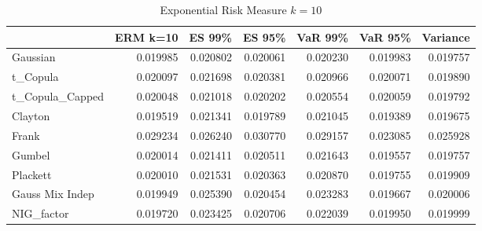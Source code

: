 
\begin{table}
\begin{tabular}{lrrrrrr}
\toprule
{} &  ERM k=10 &    ES 99\% &    ES 95\% &   VaR 99\% &   VaR 95\% &  Variance \\
\midrule
Gaussian        &  0.019985 &  0.020802 &  0.020061 &  0.020230 &  0.019983 &  \color{blue}0.019757 \\
t\_Copula        &  0.020097 &  0.021698 &  0.020381 &  0.020966 &  0.020071 &  \color{blue}0.019890 \\
t\_Copula\_Capped &  0.020048 &  0.021018 &  0.020202 &  0.020554 &  0.020059 &  \color{blue}0.019792 \\
Clayton         &  0.019519 &  0.021341 &  0.019789 &  0.021045 &  \color{blue}0.019389 &  0.019675 \\
Frank           &  0.029234 &  0.026240 &  0.030770 &  0.029157 &  \color{blue}0.023085 &  0.025928 \\
Gumbel          &  0.020014 &  0.021411 &  0.020511 &  0.021643 &  \color{blue}0.019557 &  0.019757 \\
Plackett        &  0.020010 &  0.021531 &  0.020363 &  0.020870 &  \color{blue}0.019755 &  0.019909 \\
Gauss Mix Indep &  0.019949 &  0.025390 &  0.020454 &  0.023283 &  \color{blue}0.019667 &  0.020006 \\
NIG\_factor      &  \color{blue}0.019720 &  0.023425 &  0.020706 &  0.022039 &  0.019950 &  0.019999 \\
\bottomrule
\end{tabular}
\caption{Exponential Risk Measure $k=10$}
\end{table}

